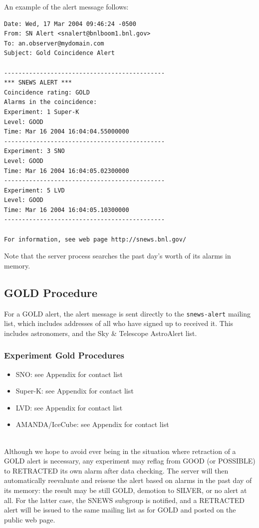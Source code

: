 \documentclass{article}
\begin{document}
An example of the alert message follows:

\begin{verbatim}
Date: Wed, 17 Mar 2004 09:46:24 -0500
From: SN Alert <snalert@bnlboom1.bnl.gov>
To: an.observer@mydomain.com
Subject: Gold Coincidence Alert

---------------------------------------------
*** SNEWS ALERT ***
Coincidence rating: GOLD
Alarms in the coincidence:
Experiment: 1 Super-K
Level: GOOD
Time: Mar 16 2004 16:04:04.55000000
---------------------------------------------
Experiment: 3 SNO
Level: GOOD 
Time: Mar 16 2004 16:04:05.02300000
---------------------------------------------
Experiment: 5 LVD
Level: GOOD 
Time: Mar 16 2004 16:04:05.10300000
---------------------------------------------

For information, see web page http://snews.bnl.gov/

\end{verbatim}

Note that the server process searches the past day's worth of its
alarms in memory.  


\subsection{GOLD Procedure}\label{GOLD}

For a GOLD alert, the alert message is sent directly to the 
{\tt snews-alert} mailing list, which includes addresses of all
who have signed up to received it. This includes astronomers,
and the Sky \& Telescope AstroAlert list. 


\subsubsection{Experiment Gold Procedures}

\begin{itemize}

\item SNO: see Appendix for contact list
\item Super-K: see Appendix for contact list
\item LVD: see Appendix for contact list
\item AMANDA/IceCube: see Appendix for contact list

\end{itemize}


\\ Although we hope
to avoid ever being in the situation where retraction of a GOLD alert
is necessary, any experiment may reflag from GOOD (or POSSIBLE) to RETRACTED its
own alarm after data checking.  The server will then automatically
reevaluate and reissue the alert based on alarms in the past day of its
memory: the result may be still GOLD, demotion to SILVER, or no alert
at all.  For the latter case, the SNEWS subgroup is 
notified, and a RETRACTED alert will be issued to the
same mailing list as for GOLD and posted on the public web page.
\end{document}
